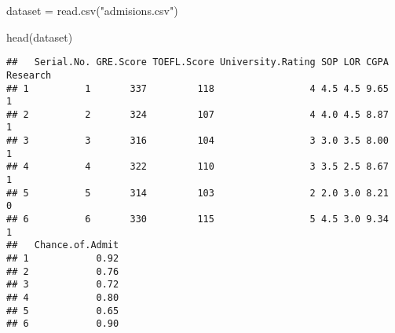\documentclass[
]{article}
\newenvironment{Shaded}{\begin{snugshade}}{\end{snugshade}}
\newcommand{\FunctionTok}[1]{\textcolor[rgb]{0.00,0.00,0.00}{#1}}
\newcommand{\NormalTok}[1]{#1}
\newcommand{\OtherTok}[1]{\textcolor[rgb]{0.56,0.35,0.01}{#1}}
\newcommand{\StringTok}[1]{\textcolor[rgb]{0.31,0.60,0.02}{#1}}
\begin{document}
\begin{Shaded}
\begin{Highlighting}[]
\NormalTok{dataset }\OtherTok{=} \FunctionTok{read.csv}\NormalTok{(}\StringTok{"admisions.csv"}\NormalTok{)}

\FunctionTok{head}\NormalTok{(dataset)}
\end{Highlighting}
\end{Shaded}

\begin{verbatim}
##   Serial.No. GRE.Score TOEFL.Score University.Rating SOP LOR CGPA Research
## 1          1       337         118                 4 4.5 4.5 9.65        1
## 2          2       324         107                 4 4.0 4.5 8.87        1
## 3          3       316         104                 3 3.0 3.5 8.00        1
## 4          4       322         110                 3 3.5 2.5 8.67        1
## 5          5       314         103                 2 2.0 3.0 8.21        0
## 6          6       330         115                 5 4.5 3.0 9.34        1
##   Chance.of.Admit
## 1            0.92
## 2            0.76
## 3            0.72
## 4            0.80
## 5            0.65
## 6            0.90
\end{verbatim}
\end{document}
